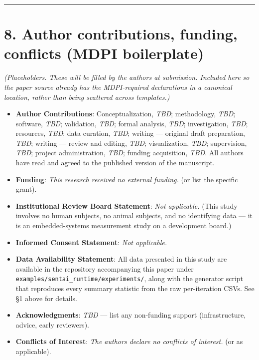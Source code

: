 \begin{center}\rule{0.5\linewidth}{0.5pt}\end{center}

\section{8. Author contributions, funding, conflicts (MDPI
boilerplate)}\label{author-contributions-funding-conflicts-mdpi-boilerplate}

\emph{(Placeholders. These will be filled by the authors at submission.
Included here so the paper source already has the MDPI-required
declarations in a canonical location, rather than being scattered across
templates.)}

\begin{itemize}
\tightlist
\item
  \textbf{Author Contributions}: Conceptualization, \emph{TBD};
  methodology, \emph{TBD}; software, \emph{TBD}; validation, \emph{TBD};
  formal analysis, \emph{TBD}; investigation, \emph{TBD}; resources,
  \emph{TBD}; data curation, \emph{TBD}; writing --- original draft
  preparation, \emph{TBD}; writing --- review and editing, \emph{TBD};
  visualization, \emph{TBD}; supervision, \emph{TBD}; project
  administration, \emph{TBD}; funding acquisition, \emph{TBD}. All
  authors have read and agreed to the published version of the
  manuscript.
\item
  \textbf{Funding}: \emph{This research received no external funding.}
  (or list the specific grant).
\item
  \textbf{Institutional Review Board Statement}: \emph{Not applicable.}
  (This study involves no human subjects, no animal subjects, and no
  identifying data --- it is an embedded-systems measurement study on a
  development board.)
\item
  \textbf{Informed Consent Statement}: \emph{Not applicable.}
\item
  \textbf{Data Availability Statement}: All data presented in this study
  are available in the repository accompanying this paper under
  \texttt{examples/sentai\_runtime/experiments/}, along with the
  generator script that reproduces every summary statistic from the raw
  per-iteration CSVs. See §1 above for details.
\item
  \textbf{Acknowledgments}: \emph{TBD} --- list any non-funding support
  (infrastructure, advice, early reviewers).
\item
  \textbf{Conflicts of Interest}: \emph{The authors declare no conflicts
  of interest.} (or as applicable).
\end{itemize}

